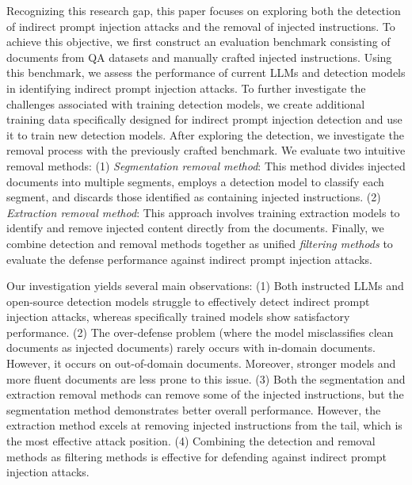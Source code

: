 Recognizing this research gap, this paper focuses on exploring both the detection of indirect prompt injection attacks and the removal of injected instructions.
To achieve this objective, we first construct an evaluation benchmark consisting of documents from QA datasets \cite{rajpurkar-etal-2016-squad, 2017arXivtriviaqa} and manually crafted injected instructions. Using this benchmark, we assess the performance of current LLMs and detection models in identifying indirect prompt injection attacks. To further investigate the challenges associated with training detection models, we create additional training data specifically designed for indirect prompt injection detection and use it to train new detection models. After exploring the detection, we investigate the removal process with the previously crafted benchmark. We evaluate two intuitive removal methods: (1) \textit{Segmentation removal method}: This method divides injected documents into multiple segments, employs a detection model to classify each segment, and discards those identified as containing injected instructions. (2) \textit{Extraction removal method}: This approach involves training extraction models to identify and remove injected content directly from the documents. Finally, we combine detection and removal methods together as unified \textit{filtering methods} to evaluate the defense performance against indirect prompt injection attacks.

Our investigation yields several main observations: (1) Both instructed LLMs \cite{gorman2022jailbreaking} and open-source detection models \cite{deberta-v3-base-prompt-injection-v2, meta2024prompt} struggle to effectively detect indirect prompt injection attacks, whereas specifically trained models show satisfactory performance. (2) The over-defense problem (where the model misclassifies clean documents as injected documents) rarely occurs with in-domain documents. However, it occurs on out-of-domain documents. 
Moreover, stronger models and more fluent documents are less prone to this issue. (3) Both the segmentation and extraction removal methods can remove some of the injected instructions, but the segmentation method demonstrates better overall performance. However, the extraction method excels at removing injected instructions from the tail, which is the most effective attack position. (4) Combining the detection and removal methods as filtering methods is effective for defending against indirect prompt injection attacks.